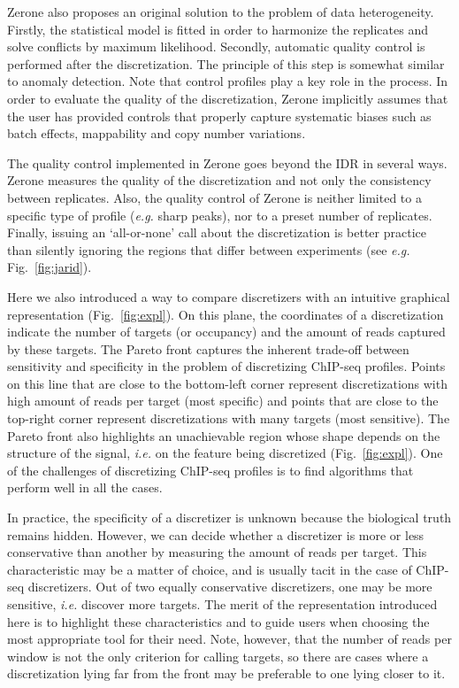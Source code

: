 \documentclass{bioinfo}
\begin{document}
Zerone also proposes an original solution to the problem of
data heterogeneity. Firstly, the statistical model is fitted
in order to harmonize the replicates and solve conflicts by maximum
likelihood. Secondly, automatic quality control is performed
after the discretization. The principle of this step is somewhat
similar to anomaly detection. Note that control profiles play a key
role in the process. In order to evaluate the quality of the
discretization, Zerone implicitly assumes that the user
has provided controls that properly capture systematic biases
such as batch effects, mappability and copy number variations.

The quality control implemented in Zerone goes beyond the
IDR \citep{li2011} in several
ways. Zerone measures the quality of the discretization and not only
the consistency between replicates. Also, the quality control of
Zerone is neither
limited to a specific type of profile (\textit{e.g.} sharp peaks),
nor to a preset number of replicates. Finally, issuing an
`all-or-none' call about the discretization is better practice
than silently ignoring the regions that differ between experiments
(see \textit{e.g.} Fig.~\ref{fig:jarid}).

Here we also introduced a way to compare discretizers with an intuitive
graphical representation (Fig.~\ref{fig:expl}). On this plane,
the coordinates of a discretization indicate the number of targets
(or occupancy) and the amount of reads captured by these targets.
The Pareto front captures the inherent trade-off between sensitivity
and specificity in the problem of discretizing ChIP-seq profiles.
Points on this line that are close to the bottom-left corner represent
discretizations with high amount of reads per target (most specific)
and points that are close to the top-right corner represent
discretizations with many targets (most sensitive). The Pareto front
also highlights an unachievable region whose shape depends on the
structure of the signal, \textit{i.e.} on the feature being discretized
(Fig.~\ref{fig:expl}). One of the challenges of discretizing ChIP-seq
profiles is to find algorithms that perform well in all the cases.

In practice, the specificity of a discretizer is unknown because
the biological truth remains hidden. However, we can decide whether
a discretizer is more or less conservative than another by measuring
the amount of reads per target. This characteristic may be a matter of
choice, and is usually tacit in the case of ChIP-seq discretizers.
Out of two equally conservative discretizers, one may be more sensitive,
\textit{i.e.} discover more targets. The merit of the representation
introduced here is to highlight these characteristics and to guide users
when choosing the most appropriate tool for their need. Note, however,
that the number of reads per window is not the only criterion for
calling targets, so there are cases where a discretization lying
far from the front may be preferable to one lying closer to it.
\end{document}

